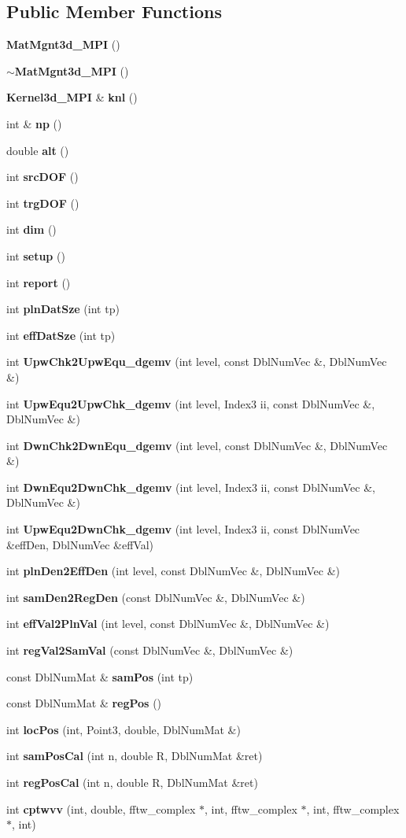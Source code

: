 \subsection*{Public Member Functions}
\begin{CompactItemize}
\item 
{\bf Mat\-Mgnt3d\_\-MPI} ()
\item 
{\bf $\sim$Mat\-Mgnt3d\_\-MPI} ()
\item 
{\bf Kernel3d\_\-MPI} \& {\bf knl} ()
\item 
int \& {\bf np} ()
\item 
double {\bf alt} ()
\item 
int {\bf src\-DOF} ()
\item 
int {\bf trg\-DOF} ()
\item 
int {\bf dim} ()
\item 
int {\bf setup} ()
\item 
int {\bf report} ()
\item 
int {\bf pln\-Dat\-Sze} (int tp)
\item 
int {\bf eff\-Dat\-Sze} (int tp)
\item 
int {\bf Upw\-Chk2Upw\-Equ\_\-dgemv} (int level, const Dbl\-Num\-Vec \&, Dbl\-Num\-Vec \&)
\item 
int {\bf Upw\-Equ2Upw\-Chk\_\-dgemv} (int level, Index3 ii, const Dbl\-Num\-Vec \&, Dbl\-Num\-Vec \&)
\item 
int {\bf Dwn\-Chk2Dwn\-Equ\_\-dgemv} (int level, const Dbl\-Num\-Vec \&, Dbl\-Num\-Vec \&)
\item 
int {\bf Dwn\-Equ2Dwn\-Chk\_\-dgemv} (int level, Index3 ii, const Dbl\-Num\-Vec \&, Dbl\-Num\-Vec \&)
\item 
int {\bf Upw\-Equ2Dwn\-Chk\_\-dgemv} (int level, Index3 ii, const Dbl\-Num\-Vec \&eff\-Den, Dbl\-Num\-Vec \&eff\-Val)
\item 
int {\bf pln\-Den2Eff\-Den} (int level, const Dbl\-Num\-Vec \&, Dbl\-Num\-Vec \&)
\item 
int {\bf sam\-Den2Reg\-Den} (const Dbl\-Num\-Vec \&, Dbl\-Num\-Vec \&)
\item 
int {\bf eff\-Val2Pln\-Val} (int level, const Dbl\-Num\-Vec \&, Dbl\-Num\-Vec \&)
\item 
int {\bf reg\-Val2Sam\-Val} (const Dbl\-Num\-Vec \&, Dbl\-Num\-Vec \&)
\item 
const Dbl\-Num\-Mat \& {\bf sam\-Pos} (int tp)
\item 
const Dbl\-Num\-Mat \& {\bf reg\-Pos} ()
\item 
int {\bf loc\-Pos} (int, Point3, double, Dbl\-Num\-Mat \&)
\item 
int {\bf sam\-Pos\-Cal} (int n, double R, Dbl\-Num\-Mat \&ret)
\item 
int {\bf reg\-Pos\-Cal} (int n, double R, Dbl\-Num\-Mat \&ret)
\item 
int {\bf cptwvv} (int, double, fftw\_\-complex $\ast$, int, fftw\_\-complex $\ast$, int, fftw\_\-complex $\ast$, int)
\end{CompactItemize}
